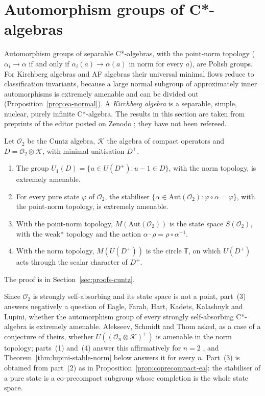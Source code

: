 \section{Automorphism groups of C*-algebras}\label{sec:operator-algebras}

Automorphism groups of separable C*-algebras, with the point-norm topology
($\alpha_i\to\alpha$ if and only if $\alpha_i(a)\to\alpha(a)$ in norm for
every $a$), are Polish groups. For Kirchberg algebras and AF algebras their
universal minimal flows reduce to classification invariants, because a large
normal subgroup of approximately inner automorphisms is extremely amenable
and can be divided out (Proposition~\ref{prop:ea-normal}). A \emph{Kirchberg
algebra} is a separable, simple, nuclear, purely infinite C*-algebra. The
results in this section are taken from preprints of the editor posted on
Zenodo \cite{LupiniCuntz2026,LupiniStable2026,LupiniUnital2026}; they have
not been refereed.

\begin{theorem}\label{thm:lupini-cuntz}
Let $\mathcal{O}_2$ be the Cuntz algebra, $\mathcal{K}$ the algebra of
compact operators and $D=\mathcal{O}_2\otimes\mathcal{K}$, with minimal
unitisation $D^+$.
\begin{enumerate}
\item The group $U_1(D)=\{u\in U(D^+) : u-1\in D\}$, with the norm topology,
  is extremely amenable.
\item For every pure state $\varphi$ of $\mathcal{O}_2$, the stabiliser
  $\{\alpha\in\mathrm{Aut}(\mathcal{O}_2) : \varphi\circ\alpha=\varphi\}$, with
  the point-norm topology, is extremely amenable.
\item With the point-norm topology, $M(\mathrm{Aut}(\mathcal{O}_2))$ is the
  state space $S(\mathcal{O}_2)$, with the weak* topology and the action
  $\alpha\cdot\rho=\rho\circ\alpha^{-1}$.
\item With the norm topology, $M(U(D^+))$ is the circle $\mathbb{T}$, on which
  $U(D^+)$ acts through the scalar character of $D^+$.
\end{enumerate}
\end{theorem}

The proof is in Section~\ref{sec:proofs-cuntz}.

\begin{remark}\label{rem:lupini-cuntz}
Since $\mathcal{O}_2$ is strongly self-absorbing and its state space is not a
point, part~(3) answers negatively a question of Eagle, Farah, Hart, Kadets,
Kalashnyk and Lupini, whether the automorphism group of every strongly
self-absorbing C*-algebra is extremely amenable. Alekseev, Schmidt and Thom
asked, as a case of a conjecture of theirs, whether
$U((\mathcal{O}_n\otimes\mathcal{K})^+)$ is amenable in the norm topology;
parts~(1) and~(4) answer this affirmatively for $n=2$ \cite{LupiniCuntz2026},
and Theorem~\ref{thm:lupini-stable-norm} below answers it for every $n$.
Part~(3) is obtained from part~(2) as in
Proposition~\ref{prop:coprecompact-ea}: the stabiliser of a pure state is a
co-precompact subgroup whose completion is the whole state space.
\end{remark}

